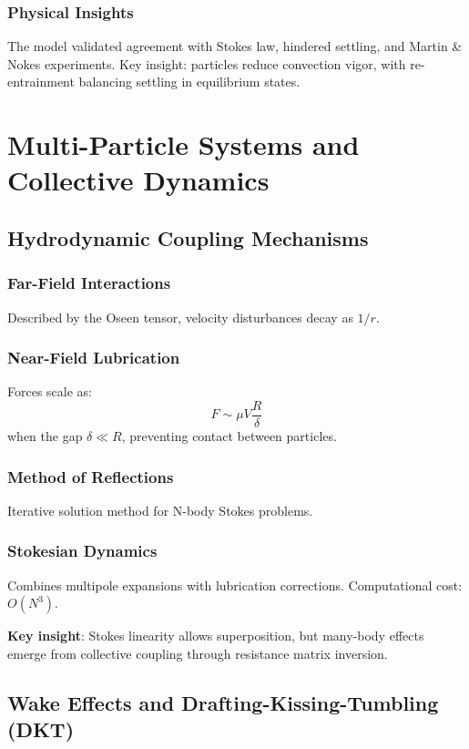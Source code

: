 \subsection{Physical Insights}
The model validated agreement with Stokes law, hindered settling, and Martin \& Nokes experiments. Key insight: particles reduce convection vigor, with re-entrainment balancing settling in equilibrium states.

\chapter{Multi-Particle Systems and Collective Dynamics}

\section{Hydrodynamic Coupling Mechanisms}

\subsection{Far-Field Interactions}
Described by the Oseen tensor, velocity disturbances decay as $1/r$.

\subsection{Near-Field Lubrication}
Forces scale as:
\begin{equation}
F \sim \mu V \frac{R}{\delta}
\end{equation}
when the gap $\delta \ll R$, preventing contact between particles.

\subsection{Method of Reflections}
Iterative solution method for N-body Stokes problems.

\subsection{Stokesian Dynamics}
Combines multipole expansions with lubrication corrections. Computational cost: $O(N^3)$.

\textbf{Key insight}: Stokes linearity allows superposition, but many-body effects emerge from collective coupling through resistance matrix inversion.

\section{Wake Effects and Drafting-Kissing-Tumbling (DKT)}

